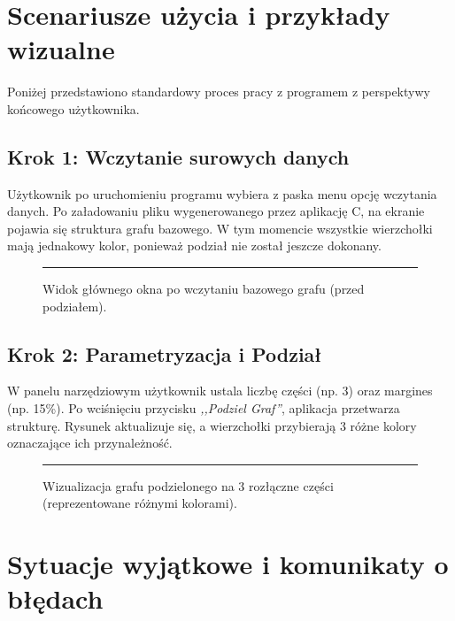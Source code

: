 \documentclass[12pt,a4paper]{article}
\begin{document}
\newpage
\section{Scenariusze użycia i przykłady wizualne}

Poniżej przedstawiono standardowy proces pracy z programem z perspektywy końcowego użytkownika.

\subsection{Krok 1: Wczytanie surowych danych}
Użytkownik po uruchomieniu programu wybiera z paska menu opcję wczytania danych. Po załadowaniu pliku wygenerowanego przez aplikację C, na ekranie pojawia się struktura grafu bazowego. W tym momencie wszystkie wierzchołki mają jednakowy kolor, ponieważ podział nie został jeszcze dokonany.

\begin{figure}[h]
    \centering
    \textcolor{gray}{\rule{0.8\textwidth}{6cm}}
    \caption{Widok głównego okna po wczytaniu bazowego grafu (przed podziałem).}
\end{figure}

\subsection{Krok 2: Parametryzacja i Podział}
W panelu narzędziowym użytkownik ustala liczbę części (np. 3) oraz margines (np. 15\%). Po wciśnięciu przycisku \textit{,,Podziel Graf''}, aplikacja przetwarza strukturę. Rysunek aktualizuje się, a wierzchołki przybierają 3 różne kolory oznaczające ich przynależność.

\begin{figure}[h]
    \centering
    \textcolor{gray}{\rule{0.8\textwidth}{6cm}}
    \caption{Wizualizacja grafu podzielonego na 3 rozłączne części (reprezentowane różnymi kolorami).}
\end{figure}

\newpage
\section{Sytuacje wyjątkowe i komunikaty o błędach}
\end{document}

